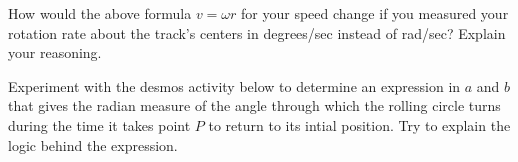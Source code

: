 \documentclass{ximera}
\begin{document}
\begin{question}  \label{Q2455: Angles}
How would the above formula $v=\omega r$ for your speed change if you measured your rotation rate about the track's centers in degrees/sec instead of rad/sec? Explain your reasoning.

\end{question}




\begin{exploration}\label{exp:angles2}
Experiment with the desmos activity below to determine an expression in $a$ and $b$ that gives the radian measure of the angle through which the rolling circle turns during the time it takes point $P$ to return to its intial position. Try to explain the logic behind the expression.


 
\begin{onlineOnly}
    \begin{center}
\end{center}
\end{onlineOnly}
\end{exploration}
\end{document}
